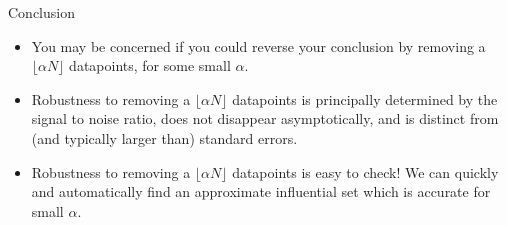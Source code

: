 \begin{frame}{Conclusion}

\begin{itemize}
\item You may be concerned if you could reverse your conclusion by removing
a $\lfloor \alpha N \rfloor$ datapoints, for some small $\alpha$.

\pause
\item Robustness to removing a $\lfloor \alpha N \rfloor$ datapoints is
principally determined by the signal to noise ratio, does not disappear
asymptotically, and is distinct from (and typically larger than) standard
errors.

\pause
\item Robustness to removing a $\lfloor \alpha N \rfloor$ datapoints is
easy to check!  We can quickly and automatically find an
approximate influential set which is accurate for small $\alpha$.



\end{itemize}

\end{frame}


